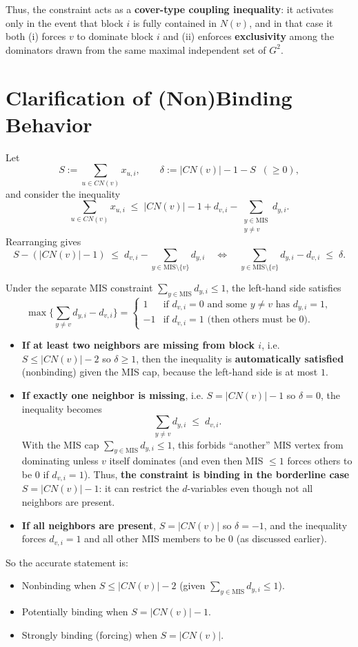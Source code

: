 Thus, the constraint acts as a \textbf{cover-type coupling inequality}: it activates only in the event that block $i$ is fully contained in $N(v)$, and in that case it both (i) forces $v$ to dominate block $i$ and (ii) enforces \textbf{exclusivity} among the dominators drawn from the same maximal independent set of $G^2$.

\section*{Clarification of (Non)Binding Behavior}

Let
\[
S:=\sum_{u\in CN(v)} x_{u,i},\qquad \delta:=|CN(v)|-1-S\;\;(\ge 0),
\]
and consider the inequality
\[
\sum_{u \in CN(v)} x_{u,i} \;\le\; |CN(v)| - 1 + d_{v,i} - \sum_{\substack{y \in \mathrm{MIS}\\ y \neq v}} d_{y,i}.
\]
Rearranging gives
\[
S - (|CN(v)|-1) \;\le\; d_{v,i} - \sum_{y\in \mathrm{MIS}\setminus\{v\}} d_{y,i}
\quad\Longleftrightarrow\quad
\sum_{y\in \mathrm{MIS}\setminus\{v\}} d_{y,i} - d_{v,i} \;\le\; \delta.
\]

Under the separate MIS constraint $\sum_{y\in \mathrm{MIS}} d_{y,i}\le 1$, the left-hand side satisfies
\[
\max\bigl\{\sum_{y\ne v} d_{y,i} - d_{v,i}\bigr\} =
\begin{cases}
1 & \text{if } d_{v,i}=0 \text{ and some } y\ne v \text{ has } d_{y,i}=1,\\
-1 & \text{if } d_{v,i}=1 \text{ (then others must be }0).
\end{cases}
\]

\begin{itemize}
    \item \textbf{If at least two neighbors are missing from block $i$}, i.e. $S\le |CN(v)|-2$ so $\delta\ge 1$, then the inequality is \textbf{automatically satisfied} (nonbinding) given the MIS cap, because the left-hand side is at most $1$.
    \item \textbf{If exactly one neighbor is missing}, i.e. $S=|CN(v)|-1$ so $\delta=0$, the inequality becomes
    \[
    \sum_{y\ne v} d_{y,i} \;\le\; d_{v,i}.
    \]
    With the MIS cap $\sum_{y\in \mathrm{MIS}} d_{y,i}\le 1$, this forbids ``another'' MIS vertex from dominating unless $v$ itself dominates (and even then MIS $\le 1$ forces others to be $0$ if $d_{v,i}=1$). Thus, \textbf{the constraint is binding in the borderline case} $S=|CN(v)|-1$: it can restrict the $d$-variables even though not all neighbors are present.
    \item \textbf{If all neighbors are present}, $S=|CN(v)|$ so $\delta=-1$, and the inequality forces $d_{v,i}=1$ and all other MIS members to be $0$ (as discussed earlier).
\end{itemize}

So the accurate statement is:
\begin{itemize}
    \item Nonbinding when $S \le |CN(v)|-2$ (given $\sum_{y\in \mathrm{MIS}} d_{y,i}\le 1$).
    \item Potentially binding when $S=|CN(v)|-1$.
    \item Strongly binding (forcing) when $S=|CN(v)|$.
\end{itemize}
